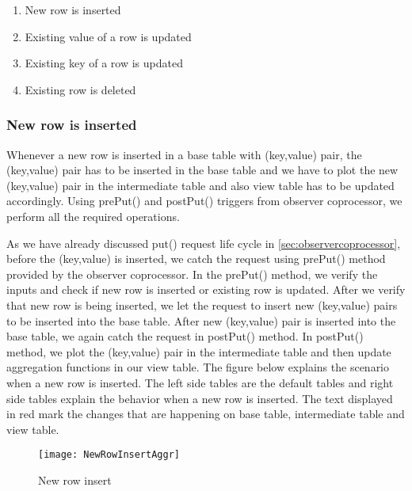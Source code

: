 \documentclass[11pt,a4paper,bibtotoc,idxtotoc,headsepline,footsepline,footexclude,BCOR12mm,DIV13]{scrbook}
\begin{document}
\begin{enumerate}
    \item New row is inserted
    \item Existing value of a row is updated
    \item Existing key of a row is updated
    \item Existing row is deleted
\end{enumerate}

\subsubsection{New row is inserted}
Whenever a new row is inserted in a base table with (key,value) pair, the (key,value) pair has to be inserted in the base table and we have to plot the new (key,value) pair in the intermediate table and also view table has to be updated accordingly. Using prePut() and postPut() triggers from observer coprocessor, we perform all the required operations.

As we have already discussed put() request life cycle in \ref{sec:observercoprocessor}, before the (key,value) is inserted, we catch the request using prePut() method provided by the observer coprocessor. In the prePut() method, we verify the inputs and check if new row is inserted or existing row is updated. After we verify that new row is being inserted, we let the request to insert new (key,value) pairs to be inserted into the base table. After new (key,value) pair is inserted into the base table, we again catch the request in postPut() method. In postPut() method, we plot the (key,value) pair in the intermediate table and then update aggregation functions in our view table. The figure below explains the scenario when a new row is inserted. The left side tables are the default tables and right side tables explain the behavior when a new row is inserted. The text displayed in red mark the changes that are happening on base table, intermediate table and view table. 
\begin{figure}
    \centering
    \texttt{[image: NewRowInsertAggr]}
    \caption{New row insert}
    \label{sec:newrowinsertagggregation}
    
\end{figure}

\newpage
\end{document}
